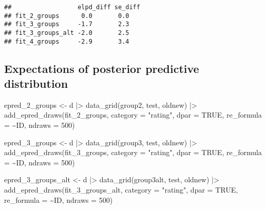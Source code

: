 \documentclass[
  man,floatsintext]{apa7}
\newenvironment{Shaded}{\begin{snugshade}}{\end{snugshade}}
\newcommand{\AttributeTok}[1]{\textcolor[rgb]{0.77,0.63,0.00}{#1}}
\newcommand{\ConstantTok}[1]{\textcolor[rgb]{0.00,0.00,0.00}{#1}}
\newcommand{\DecValTok}[1]{\textcolor[rgb]{0.00,0.00,0.81}{#1}}
\newcommand{\FunctionTok}[1]{\textcolor[rgb]{0.00,0.00,0.00}{#1}}
\newcommand{\NormalTok}[1]{#1}
\newcommand{\OtherTok}[1]{\textcolor[rgb]{0.56,0.35,0.01}{#1}}
\newcommand{\SpecialCharTok}[1]{\textcolor[rgb]{0.00,0.00,0.00}{#1}}
\newcommand{\StringTok}[1]{\textcolor[rgb]{0.31,0.60,0.02}{#1}}
\begin{document}
\begin{verbatim}
##                  elpd_diff se_diff
## fit_2_groups      0.0       0.0   
## fit_3_groups     -1.7       2.3   
## fit_3_groups_alt -2.0       2.5   
## fit_4_groups     -2.9       3.4
\end{verbatim}

\hypertarget{expectations-of-posterior-predictive-distribution}{%
\subsection{Expectations of posterior predictive distribution}\label{expectations-of-posterior-predictive-distribution}}

\begin{Shaded}
\begin{Highlighting}[]
\NormalTok{epred\_2\_groups }\OtherTok{\textless{}{-}}\NormalTok{ d }\SpecialCharTok{|\textgreater{}}
  \FunctionTok{data\_grid}\NormalTok{(group2, test, oldnew) }\SpecialCharTok{|\textgreater{}}
  \FunctionTok{add\_epred\_draws}\NormalTok{(fit\_2\_groups,}
                  \AttributeTok{category =} \StringTok{"rating"}\NormalTok{,}
                  \AttributeTok{dpar =} \ConstantTok{TRUE}\NormalTok{,}
                  \AttributeTok{re\_formula =} \SpecialCharTok{\textasciitilde{}}\NormalTok{ID,}
                  \AttributeTok{ndraws =} \DecValTok{500}\NormalTok{)}

\NormalTok{epred\_3\_groups }\OtherTok{\textless{}{-}}\NormalTok{ d }\SpecialCharTok{|\textgreater{}}
  \FunctionTok{data\_grid}\NormalTok{(group3, test, oldnew) }\SpecialCharTok{|\textgreater{}}
  \FunctionTok{add\_epred\_draws}\NormalTok{(fit\_3\_groups,}
                  \AttributeTok{category =} \StringTok{"rating"}\NormalTok{,}
                  \AttributeTok{dpar =} \ConstantTok{TRUE}\NormalTok{,}
                  \AttributeTok{re\_formula =} \SpecialCharTok{\textasciitilde{}}\NormalTok{ID,}
                  \AttributeTok{ndraws =} \DecValTok{500}\NormalTok{)}

\NormalTok{epred\_3\_groups\_alt }\OtherTok{\textless{}{-}}\NormalTok{ d }\SpecialCharTok{|\textgreater{}}
  \FunctionTok{data\_grid}\NormalTok{(group3alt, test, oldnew) }\SpecialCharTok{|\textgreater{}}
  \FunctionTok{add\_epred\_draws}\NormalTok{(fit\_3\_groups\_alt,}
                  \AttributeTok{category =} \StringTok{"rating"}\NormalTok{,}
                  \AttributeTok{dpar =} \ConstantTok{TRUE}\NormalTok{,}
                  \AttributeTok{re\_formula =} \SpecialCharTok{\textasciitilde{}}\NormalTok{ID,}
                  \AttributeTok{ndraws =} \DecValTok{500}\NormalTok{)}


\end{Highlighting}
\end{Shaded}
\end{document}
